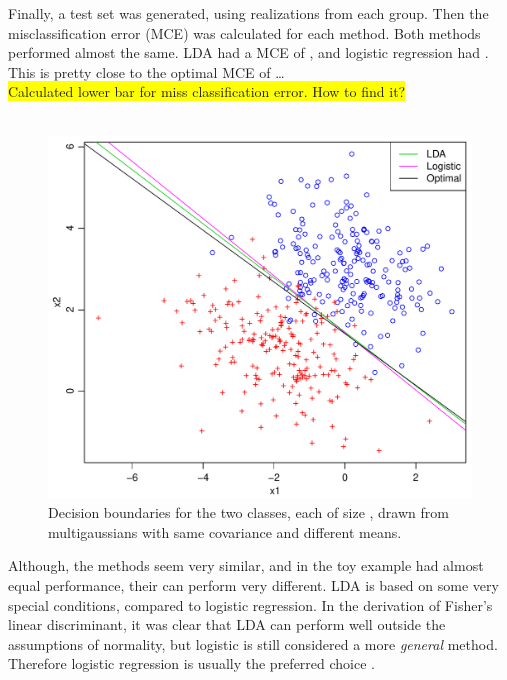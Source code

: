 Finally, a test set was generated, using  realizations from each group. Then the misclassification error (MCE) was calculated for each method.  Both methods performed almost the same. LDA had a MCE of , and logistic regression had . This is pretty close to the optimal MCE of \ldots {} \\
\colorbox{yellow}{Calculated lower bar for miss classification error. How to find it?}\\
\\
%
\begin{figure}[h!]
\begin{center}
    \includegraphics[scale=0.5]{./figures/ldaVsLogistic.pdf}
\end{center}
\caption{Decision boundaries for the two classes, each of size , drawn from multigaussians with same covariance and different means.}
\label{fig:ldaVsLogistic}
\end{figure}
%
Although, the methods seem very similar, and in the toy example had almost equal performance, their can perform very different. LDA is based on some very special conditions, compared to logistic regression. In the derivation of Fisher's linear discriminant, it was clear that LDA can perform well outside the assumptions of normality, but logistic is still considered a more \textit{general} method. Therefore logistic regression is usually the preferred choice \cite[p.~128]{modstat}.
